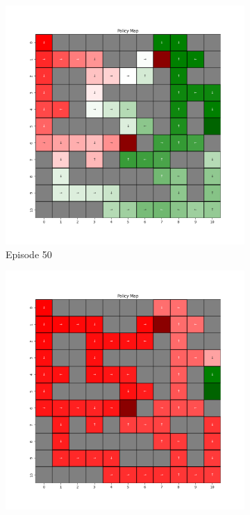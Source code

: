 \documentclass{assignment}
\begin{document}
\begin{figure}[H]
\begin{subfigure}{0.3\textwidth}
        \includegraphics[width=\textwidth]{figures/policy_q/epsilon_sweep/policy_alpha_0.1_gamma_0.95_epsilon_0.5_iteration_50.png}
    \caption{Episode 50}
    \end{subfigure}\hfill
    \begin{subfigure}{0.3\textwidth}
        \includegraphics[width=\textwidth]{figures/policy_q/epsilon_sweep/policy_alpha_0.1_gamma_0.95_epsilon_0.5_iteration_100.png}

\end{subfigure}
\end{figure}
\end{document}

